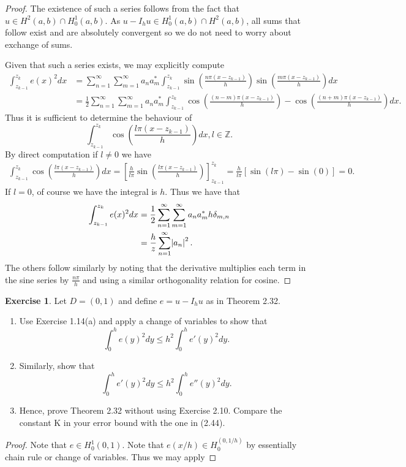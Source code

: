 \documentclass{amsart}
\theoremstyle{plain}
\theoremstyle{definition}
\newtheorem{exer}{Exercise}[section]
\newcommand{\Z}{\mathbb{Z}}
\begin{document}
\begin{proof}
    The existence of such a series follows from the fact that $u\in H^2(a,b) \cap H_0^1(a,b)$. As $u-I_h u \in H_0^1(a,b)\cap H^2(a,b)$, all sums that follow exist and are absolutely convergent so we do not need to worry about exchange of sums. 
    \par Given that such a series exists, we may explicitly compute 
    \begin{align*}
        \int_{z_{k-1}}^{z_k} e(x)^2 dx &= \sum_{n=1}^\infty \sum_{m=1}^\infty a_n a_m^* \int_{z_{k-1}}^{z_k} \sin\left(\frac{n\pi (x-z_{k-1})}{h}\right)\sin\left(\frac{m\pi (x-z_{k-1})}{h}\right) dx\\
        &=  \frac{1}{2}\sum_{n=1}^\infty \sum_{m=1}^\infty a_n a_m^* \int_{z_{k-1}}^{z_k} \cos\left(\frac{(n-m)\pi (x-z_{k-1})}{h}\right) - \cos\left(\frac{(n+m)\pi (x-z_{k-1})}{h}\right) dx.
    \end{align*}
    Thus it is sufficient to determine the behaviour of $$\int_{z_{k-1}}^{z_k} \cos\left(\frac{l\pi (x-z_{k-1})}{h}\right) dx, l\in \Z. $$ By direct computation if $l\neq 0$ we have
    \begin{align*}
        \int_{z_{k-1}}^{z_k} \cos\left(\frac{l\pi (x-z_{k-1})}{h}\right) dx = \left[\frac{h}{l\pi} \sin\left(\frac{l\pi (x-z_{k-1})}{h}\right)\right]_{z_{k-1}}^{z_k} = \frac{h}{l\pi} \left[\sin(l\pi) - \sin(0)\right] = 0. 
    \end{align*}
    If $l= 0$, of course we have the integral is $h$. Thus we have that 
     \begin{align*}
        \int_{z_{k-1}}^{z_k} e(x)^2 dx  &=  \frac{1}{2}\sum_{n=1}^\infty \sum_{m=1}^\infty a_n a_m^* h \delta_{m,n} \\
        &= \frac{h}{z}\sum_{n=1}^{\infty} \abs{a_n}^2.
    \end{align*}
    The others follow similarly by noting that the derivative multiplies each term in the sine series by $\frac{n\pi}{h}$ and using a similar orthogonality relation for cosine. 
\end{proof}

\begin{exer}
     Let $D = (0, 1)$ and define $e = u − I_h u$ as in Theorem 2.32.
    \begin{enumerate}[label=\alph*.]
        \item Use Exercise 1.14(a) and apply a change of variables to show that 
        $$\int_0^h e(y)^2 dy \leq h^2 \int_0^h  e'(y)^2 dy.$$
        \item Similarly, show that 
        $$\int_0^h e'(y)^2 dy \leq h^2 \int_0^h e''(y)^2 dy.$$
        \item  Hence, prove Theorem 2.32 without using Exercise 2.10. Compare the constant K in your error bound with the one in (2.44).
    \end{enumerate}
\end{exer}
\begin{proof}
    Note that $e\in H_0^1(0,1)$. Note that $e(x/h) \in H_0^(0,1/h)$ by essentially chain rule or change of variables. Thus we may apply 
\end{proof}

\printbibliography
\end{document}
